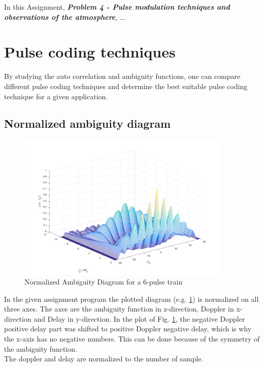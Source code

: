 

In this Assignment, \textit{\textbf{Problem 4 - Pulse modulation techniques and observations of the atmosphere}}, ...


\section{Pulse coding techniques}
By studying the auto correlation and ambiguity functions, one can compare different pulse coding techniques and determine the best suitable pulse coding technique for a given application.

\subsection{Normalized ambiguity diagram}
\begin{figure}[h!]
	\centering
	\includegraphics[width=0.9\textwidth]{images/ass1_1_AmbDiag_PulseTrain}
	\caption{Normalized Ambiguity Diagram for a 6-pulse train}
	\label{fig:ambdiag1}
\end{figure}
In the given assignment program the plotted diagram (e.g. \ref{fig:ambdiag1}) is normalized on all three axes.
The axes are the ambiguity function in z-direction, Doppler in x-direction and Delay in y-direction. In the plot of Fig. \ref{fig:ambdiag1}, the negative Doppler positive delay part was shifted to positive Doppler negative delay, which is why the x-axis has no negative numbers. This can be done because of the symmetry of the ambiguity function.\\
The doppler and delay are normalized to the number of sample. 

